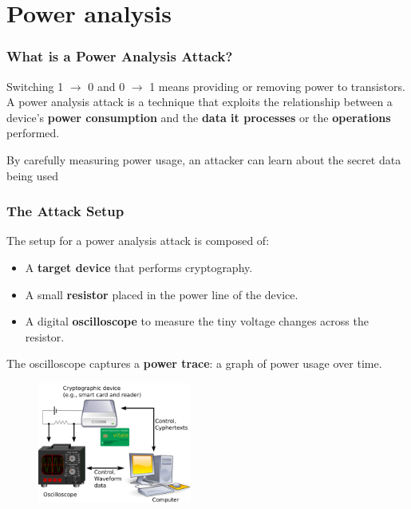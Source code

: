 \section{Power analysis}

\begin{frame}
    \frametitle{What is a Power Analysis Attack?}

    \begin{alertblock}{}
        Switching 1 $\rightarrow$ 0 and 0 $\rightarrow$ 1 means providing or removing power to transistors.\newline
        A power analysis attack is a technique that exploits the relationship between a device's \textbf{power consumption} and the \textbf{data it processes}  or the \textbf{operations} performed.

        By carefully measuring power usage, an attacker can learn about the secret data being used
    \end{alertblock}

    
\end{frame}

\begin{frame}
    \frametitle{The Attack Setup}

        The setup for a power analysis attack is composed of:
        \begin{itemize}
            \item A \textbf{target device} that performs cryptography.
            \item A small \textbf{resistor} placed in the power line of the device.
            \item A digital \textbf{oscilloscope} to measure the tiny voltage changes across the resistor.
        \end{itemize}
        The oscilloscope captures a \textbf{power trace}: a graph of power usage over time.


    \begin{figure}
        \centering
        \includegraphics[width=0.45\textwidth]{main thing/Pictures/scheme2_oscilloscope.png}
       
    \end{figure}
\end{frame}

